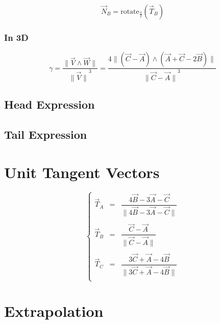 \documentclass[aps,10pt]{revtex4}
\newcommand{\mynorm}[1]{{\parallel{#1}\parallel}}
\newcommand{\myunit}[1]{\dfrac{{#1}}{\mynorm{{#1}}}}
\begin{document}
\begin{equation}
	\vec{N}_{B} = \mathrm{rotate}_{\frac{\pi}{2}} \left(\vec{T}_B\right)
\end{equation}

\subsubsection{In 3D}

\begin{equation}
	\gamma = \dfrac{\mynorm{\vec{V}\wedge\vec{W}}}{\mynorm{\vec{V}}^3} = 
	\dfrac{4\mynorm{\left(\vec{C}-\vec{A}\right)\wedge\left(\vec{A}+\vec{C}-2\vec{B}\right)}}
	{\mynorm{\vec{C}-\vec{A}}^3}
\end{equation}

\subsection{Head Expression}

\subsection{Tail Expression}


\section{Unit Tangent Vectors}

\begin{equation}
\left\lbrace
\begin{array}{rcl}
	\vec{T}_A & = & \myunit{4\vec{B}-3\vec{A}-\vec{C}}\\
	\\
	\vec{T}_B & = & \myunit{\vec{C}-\vec{A}}  \\
	\\
	\vec{T}_C & = & \myunit{3\vec{C}+\vec{A}-4\vec{B}}\\
\end{array}
\right.
\end{equation}

\section{Extrapolation}
\end{document}
